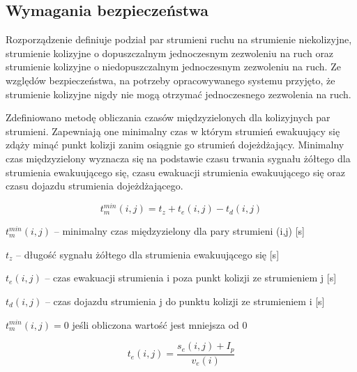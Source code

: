 \subsection{Wymagania bezpieczeństwa}
Rozporządzenie definiuje podział par strumieni ruchu na strumienie niekolizyjne, strumienie kolizyjne o dopuszczalnym jednoczesnym zezwoleniu na ruch oraz strumienie kolizyjne o niedopuszczalnym jednoczesnym zezwoleniu na ruch. Ze względów bezpieczeństwa, na potrzeby opracowywanego systemu przyjęto, że strumienie kolizyjne nigdy nie mogą otrzymać jednoczesnego zezwolenia na ruch.

Zdefiniowano metodę obliczania czasów międzyzielonych dla kolizyjnych par strumieni. Zapewniają one minimalny czas w którym strumień ewakuujący się zdąży minąć punkt kolizji zanim osiągnie go strumień dojeżdżający. Minimalny czas międzyzielony wyznacza się na podstawie czasu trwania sygnału żółtego dla strumienia ewakuującego się, czasu ewakuacji strumienia ewakuującego się oraz czasu dojazdu strumienia dojeżdżającego.

\begin{equation}
	t^{min}_{m} (i,j) = t_{z} + t_{e} (i,j) - t_{d} (i,j)
\end{equation}

\begin{math} t^{min}_{m} (i,j) \end{math} \textrm{ -- minimalny czas międzyzielony dla pary strumieni (i,j) [s]}

\begin{math} t_{z} \end{math} \textrm{ -- długość sygnału żółtego dla strumienia ewakuującego się [s]}

\begin{math} t_{e} (i,j) \end{math} \textrm{ -- czas ewakuacji strumienia i poza punkt kolizji ze strumieniem j [s]}

\begin{math} t_{d} (i,j) \end{math} \textrm{ -- czas dojazdu strumienia j do punktu kolizji ze strumieniem i [s]}

\begin{math} t^{min}_{m} (i,j) = 0 \end{math} \textrm{ jeśli obliczona wartość jest mniejsza od 0}

\begin{equation}
	t_{e} (i,j) = \frac{s_{e} (i,j) + I_p}{v_{e} (i)}
\end{equation}

